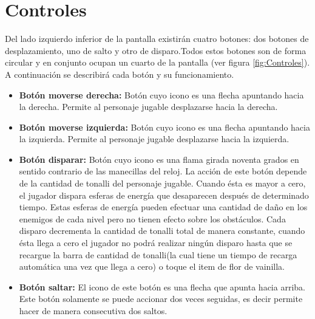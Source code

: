	\section{Controles}
	Del lado izquierdo inferior de la pantalla existirán cuatro botones: dos botones de desplazamiento, uno de salto y otro de disparo.Todos estos botones son de forma circular y en conjunto ocupan un cuarto de la pantalla (ver figura \ref{fig:Controles}). A continuación se describirá cada botón y su funcionamiento.
	\begin{itemize}
		\item \textbf{Botón moverse derecha:} Botón cuyo icono es una flecha apuntando hacia la derecha. Permite al personaje jugable desplazarse hacia la derecha.
		\item \textbf{Botón moverse izquierda:} Botón cuyo icono es una flecha apuntando hacia la izquierda. Permite al personaje jugable desplazarse hacia la izquierda.
		\item \textbf{Botón disparar:} Botón cuyo icono es una flama girada noventa grados en sentido contrario de las manecillas del reloj. La acción de este botón depende de la cantidad de tonalli del personaje jugable. Cuando ésta es mayor a cero, el jugador dispara esferas de energía que desaparecen después de determinado tiempo. Estas esferas de energía pueden efectuar una cantidad de daño en los enemigos de cada nivel pero no tienen efecto sobre los obstáculos. Cada disparo decrementa la cantidad de tonalli total de manera constante, cuando ésta llega a cero el jugador no podrá realizar ningún disparo hasta que se recargue la barra de cantidad de tonalli(la cual tiene un tiempo de recarga automática una vez que llega a cero) o toque el item de flor de vainilla.
		\item \textbf{Botón saltar:} El icono de este botón es una flecha que apunta hacia arriba. Este botón solamente se puede accionar dos veces seguidas, es decir permite hacer de manera consecutiva dos saltos.  
	\end{itemize}

